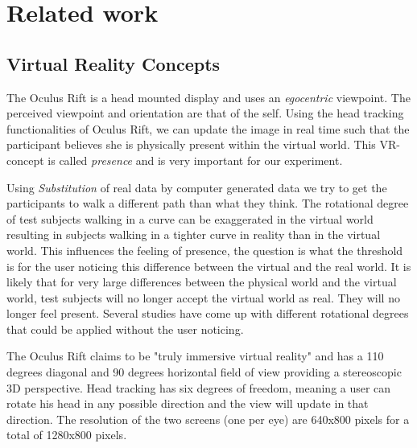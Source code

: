 \section{Related work}


\subsection{Virtual Reality Concepts}\label{sec:concepts}
The Oculus Rift is a head mounted display and uses an \textit{egocentric} viewpoint. 
The perceived viewpoint and orientation are that of the self.
Using the head tracking functionalities of Oculus Rift, we can update the image in real time such that the participant believes she is physically present within the virtual world.
This VR-concept is called \textit{presence} and is very important for our experiment.

Using \textit{Substitution} of real data by computer generated data we try to get the participants to walk a different path than what they think. 
The rotational degree of test subjects walking in a curve can be exaggerated in the virtual world resulting in subjects walking in a tighter curve in reality than in the virtual world.
This influences the feeling of presence, the question is what the threshold is for the user noticing this difference between the virtual and the real world. 
It is likely that for very large differences between the physical world and the virtual world, test subjects will no longer accept the virtual world as real.
They will no longer feel present. 
Several studies \cite{steinicke1} \cite{steinicke2} have come up with different rotational degrees that could be applied without the user noticing.%

The Oculus Rift claims to be "truly immersive virtual reality" and has a 110 degrees diagonal and 90 degrees horizontal field of view providing a stereoscopic 3D perspective.
Head tracking has six degrees of freedom, meaning a user can rotate his head in any possible direction and the view will update in that direction.
The resolution of the two screens (one per eye) are 640x800 pixels for a total of 1280x800 pixels.
